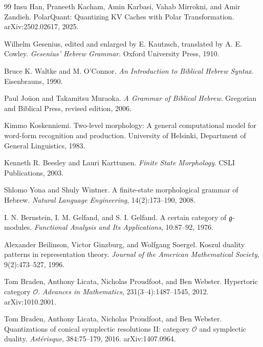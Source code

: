 \documentclass[11pt]{article}
\theoremstyle{definition}
\theoremstyle{plain}
\theoremstyle{remark}
\numberwithin{equation}{section}
\begin{document}
\begin{thebibliography}{99}
Insu Han, Praneeth Kacham, Amin Karbasi, Vahab Mirrokni, and Amir Zandieh.
\newblock PolarQuant: Quantizing KV Caches with Polar Transformation.
\newblock arXiv:2502.02617, 2025.

Wilhelm Gesenius, edited and enlarged by E. Kautzsch, translated by A. E. Cowley.
\newblock \emph{Gesenius' Hebrew Grammar}.
\newblock Oxford University Press, 1910.

Bruce K. Waltke and M. O'Connor.
\newblock \emph{An Introduction to Biblical Hebrew Syntax}.
\newblock Eisenbrauns, 1990.

Paul Joüon and Takamitsu Muraoka.
\newblock \emph{A Grammar of Biblical Hebrew}.
\newblock Gregorian and Biblical Press, revised edition, 2006.

Kimmo Koskenniemi.
\newblock Two-level morphology: A general computational model for word-form recognition and production.
\newblock University of Helsinki, Department of General Linguistics, 1983.

Kenneth R. Beesley and Lauri Karttunen.
\newblock \emph{Finite State Morphology}.
\newblock CSLI Publications, 2003.

Shlomo Yona and Shuly Wintner.
\newblock A finite-state morphological grammar of Hebrew.
\newblock \emph{Natural Language Engineering}, 14(2):173--190, 2008.


I. N. Bernstein, I. M. Gelfand, and S. I. Gelfand.
\newblock A certain category of $\mathfrak g$-modules.
\newblock \emph{Functional Analysis and Its Applications}, 10:87--92, 1976.

Alexander Beilinson, Victor Ginzburg, and Wolfgang Soergel.
\newblock Koszul duality patterns in representation theory.
\newblock \emph{Journal of the American Mathematical Society}, 9(2):473--527, 1996.

Tom Braden, Anthony Licata, Nicholas Proudfoot, and Ben Webster.
\newblock Hypertoric category $\mathcal O$.
\newblock \emph{Advances in Mathematics}, 231(3--4):1487--1545, 2012. arXiv:1010.2001.

Tom Braden, Anthony Licata, Nicholas Proudfoot, and Ben Webster.
\newblock Quantizations of conical symplectic resolutions II: category $\mathcal O$ and symplectic duality.
\newblock \emph{Ast\'erisque}, 384:75--179, 2016. arXiv:1407.0964.


\end{thebibliography}
\end{document}
